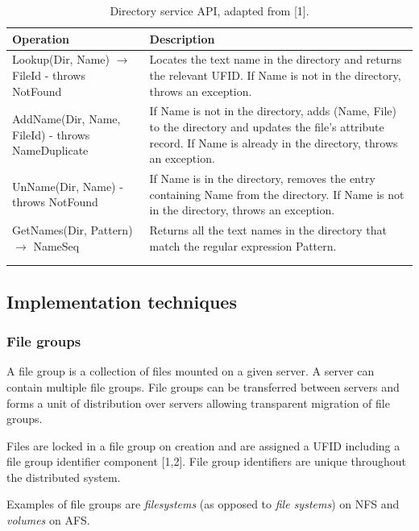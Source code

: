\begin{table}
	\caption{Directory service API, adapted from [1].}
	\label{tab:api:directoryservice}
	\begin{tabular}{p{150px} | p{250px}}
		\textbf{Operation} & \textbf{Description} \\
		\hline
		Lookup(Dir, Name) $\rightarrow$ FileId - throws NotFound 	& Locates the text name in the directory and returns the relevant UFID. If Name is not in the directory, throws an exception. \\
		AddName(Dir, Name, FileId) - throws NameDuplicate 				& If Name is not in the directory, adds (Name, File) to the directory and updates the file's attribute record. If Name is already in the directory, throws an exception. \\
		UnName(Dir, Name) - throws NotFound 											& If Name is in the directory, removes the entry containing Name from the directory. If Name is not in the directory, throws an exception. \\
		GetNames(Dir, Pattern) $\rightarrow$ NameSeq 							& Returns all the text names in the directory that match the regular expression Pattern. \\
		 &  \\
		 &  \\
		\hline
	\end{tabular}
\end{table}


\subsection{Implementation techniques}

\subsubsection{File groups}

A file group is a collection of files mounted on a given server. A server can contain multiple file groups. File groups can be transferred between servers and forms a unit of distribution over servers allowing transparent migration of file groups.

Files are locked in a file group on creation and are assigned a UFID including a file group identifier component [1,2]. File group identifiers are unique throughout the distributed system.

Examples of file groups are \emph{filesystems} (as opposed to \emph{file systems}) on NFS and \emph{volumes} on AFS.


